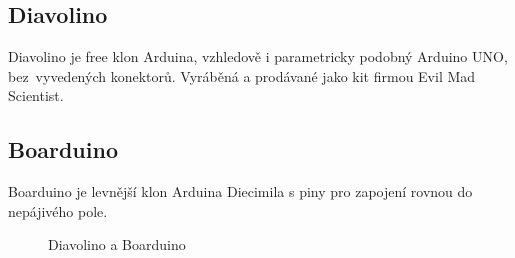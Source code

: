 	\subsection{Diavolino} 
	Diavolino je free klon Arduina, vzhledově i parametricky podobný Arduino UNO, bez~vyvedených konektorů. Vyráběná a prodávané jako kit firmou Evil Mad Scientist.
		
	\subsection{Boarduino} 
	Boarduino je levnější klon Arduina Diecimila s piny pro zapojení rovnou do nepájivého pole.

\begin{figure}[!ht]
    \centering
			\hspace*{5mm}
					\caption{Diavolino a Boarduino}
					\vspace{-30pt}	
	\end{figure}	


